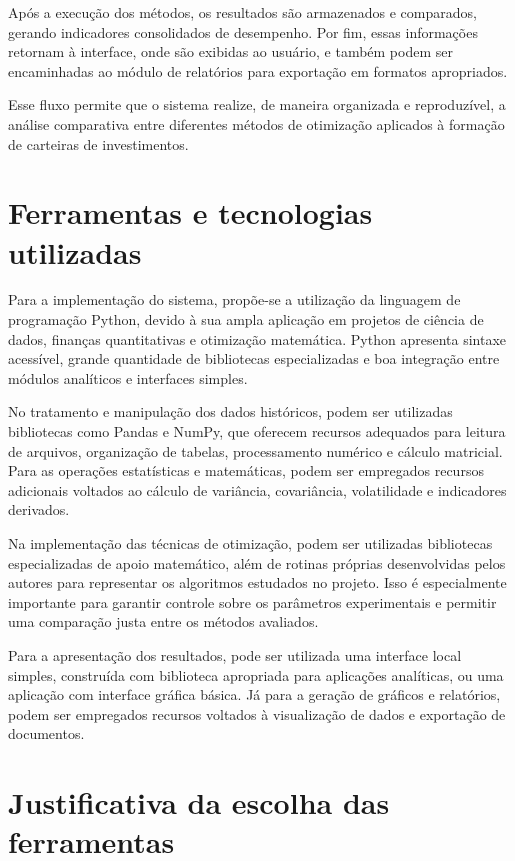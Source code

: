 \documentclass[
	12pt,				%
	openright,			%
	oneside,			    %
	a4paper,				%
	english,			%
	french,			%
	spanish,			%
	brazil			%
	]{abntex2}
\begin{document}
Após a execução dos métodos, os resultados são armazenados e comparados, gerando indicadores consolidados de desempenho. Por fim, essas informações retornam à interface, onde são exibidas ao usuário, e também podem ser encaminhadas ao módulo de relatórios para exportação em formatos apropriados.

Esse fluxo permite que o sistema realize, de maneira organizada e reproduzível, a análise comparativa entre diferentes métodos de otimização aplicados à formação de carteiras de investimentos.

\section{Ferramentas e tecnologias utilizadas}

Para a implementação do sistema, propõe-se a utilização da linguagem de programação Python, devido à sua ampla aplicação em projetos de ciência de dados, finanças quantitativas e otimização matemática. Python apresenta sintaxe acessível, grande quantidade de bibliotecas especializadas e boa integração entre módulos analíticos e interfaces simples.

No tratamento e manipulação dos dados históricos, podem ser utilizadas bibliotecas como Pandas e NumPy, que oferecem recursos adequados para leitura de arquivos, organização de tabelas, processamento numérico e cálculo matricial. Para as operações estatísticas e matemáticas, podem ser empregados recursos adicionais voltados ao cálculo de variância, covariância, volatilidade e indicadores derivados.

Na implementação das técnicas de otimização, podem ser utilizadas bibliotecas especializadas de apoio matemático, além de rotinas próprias desenvolvidas pelos autores para representar os algoritmos estudados no projeto. Isso é especialmente importante para garantir controle sobre os parâmetros experimentais e permitir uma comparação justa entre os métodos avaliados.

Para a apresentação dos resultados, pode ser utilizada uma interface local simples, construída com biblioteca apropriada para aplicações analíticas, ou uma aplicação com interface gráfica básica. Já para a geração de gráficos e relatórios, podem ser empregados recursos voltados à visualização de dados e exportação de documentos.

\section{Justificativa da escolha das ferramentas}
\end{document}
